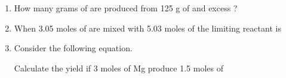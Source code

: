 \documentclass[main.tex]{subfiles}
\begin{document}
\begin{fullwidth}
\begin{multicols*}{2}
\begin{enumerate}
\item  How many grams of  are produced from 125 g of  and excess ?
 \begin{center}\end{center}
 \begin{enumerate}[label=(\alph*)]\vspace{-0.5cm}
\end{enumerate}\vspace{-0.5cm}

\item  When 3.05 moles of  are mixed with 5.03 moles of  the limiting reactant is   
\begin{center}\end{center}
 \begin{enumerate}[label=(\alph*)]\vspace{-0.5cm}
\end{enumerate}\vspace{-0.5cm}

\item  Consider the following equation. 
	\begin{center}\end{center}
Calculate the yield if 3 moles of Mg produce 1.5 moles of 
 \begin{enumerate}[label=(\alph*)]\vspace{-0.5cm}
\end{enumerate}\vspace{-0.5cm}


\end{enumerate}
\end{multicols*}
\end{fullwidth}
\end{document}

